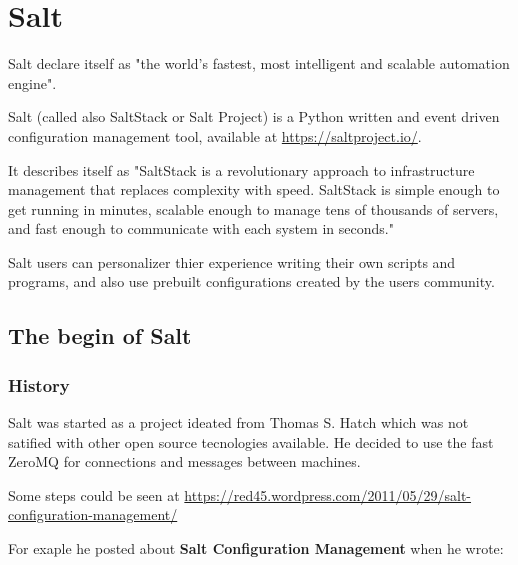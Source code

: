 \documentclass[12pt,a4paper,openright,twoside]{book}
\begin{document}




\chapter{Salt}
Salt declare itself as "the world's fastest, most intelligent and scalable automation engine"\cite{saltDocAbout}.


Salt (called also SaltStack or Salt Project) is a Python written and event driven configuration management tool, available at \url{https://saltproject.io/}.


It describes itself as "SaltStack is a revolutionary approach to infrastructure management that replaces complexity with speed. SaltStack is simple enough to get running in minutes, scalable enough to manage tens of thousands of servers, and fast enough to communicate with each system in seconds."\cite{saltDocStart}


Salt users can personalizer thier experience writing their own scripts and programs, and also use prebuilt configurations created by the users community.

\section{The begin of Salt}

\subsection{History}
Salt was started as a project ideated from Thomas S. Hatch which was not satified with other open source tecnologies available\cite{saltFloss}. He decided to use the fast ZeroMQ for connections and messages between machines.

Some steps could be seen at \url{https://red45.wordpress.com/2011/05/29/salt-configuration-management/}


For exaple he posted about \textbf{Salt Configuration Management} when he wrote:
\end{document}
